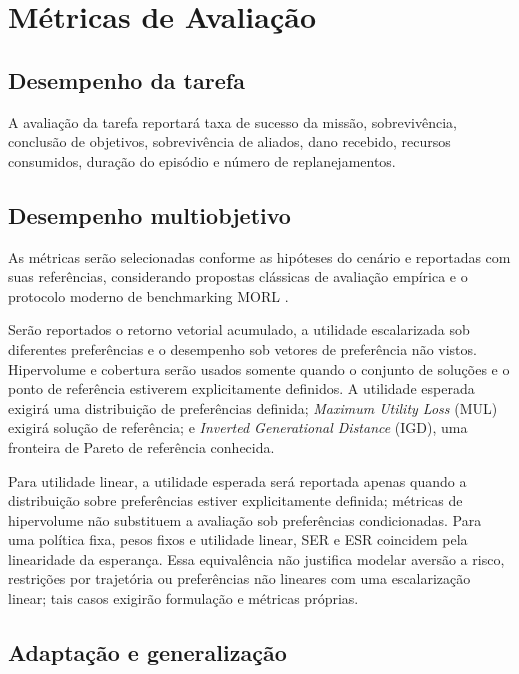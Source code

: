 \chapter{Métricas de Avaliação}

\section{Desempenho da tarefa}

A avaliação da tarefa reportará taxa de sucesso da missão, sobrevivência,
conclusão de objetivos, sobrevivência de aliados, dano recebido, recursos
consumidos, duração do episódio e número de replanejamentos.

\section{Desempenho multiobjetivo}

As métricas serão selecionadas conforme as hipóteses do cenário e reportadas
com suas referências, considerando propostas clássicas de avaliação empírica e
o protocolo moderno de benchmarking MORL \cite{vamplew2011,felten2023toolkit}.

Serão reportados o retorno vetorial acumulado, a utilidade escalarizada sob
diferentes preferências e o desempenho sob vetores de preferência não vistos.
Hipervolume e cobertura serão usados somente quando o conjunto de soluções e o
ponto de referência estiverem explicitamente definidos. A utilidade esperada
exigirá uma distribuição de preferências definida; \textit{Maximum Utility Loss}
(MUL) exigirá solução de referência; e \textit{Inverted Generational Distance}
(IGD), uma fronteira de Pareto de referência conhecida.

Para utilidade linear, a utilidade esperada será reportada apenas quando a
distribuição sobre preferências estiver explicitamente definida; métricas de
hipervolume não substituem a avaliação sob preferências condicionadas.
Para uma política fixa, pesos fixos e utilidade linear, SER e ESR coincidem
pela linearidade da esperança. Essa equivalência não justifica modelar
aversão a risco, restrições por trajetória ou preferências não lineares com
uma escalarização linear; tais casos exigirão formulação e métricas próprias.

\section{Adaptação e generalização}


